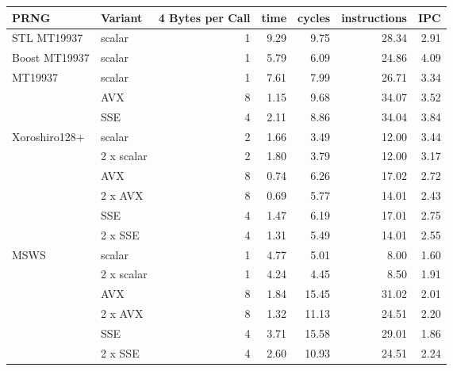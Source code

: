 \documentclass{stdlocal}
\begin{document}
\begin{tabular}{llrrrrr}
  \hline
  PRNG & Variant & 4 Bytes per Call & time & cycles & instructions & IPC \\
  \hline
  \hline
  STL MT19937 & scalar & 1 & 9.29 & 9.75 & 28.34 & 2.91 \\
  \hline
  Boost MT19937 & scalar & 1 & 5.79 & 6.09 & 24.86 & 4.09 \\
  \hline
  \multirow{3}{*}{MT19937}
  & scalar & 1 & 7.61 & 7.99 & 26.71 & 3.34 \\
  & AVX & 8 & 1.15 & 9.68 & 34.07 & 3.52 \\
  & SSE & 4 & 2.11 & 8.86 & 34.04 & 3.84 \\
  \hline
  \multirow{6}{*}{Xoroshiro128+}
  & scalar & 2 & 1.66 & 3.49 & 12.00 & 3.44 \\
  & 2 x scalar & 2 & 1.80 & 3.79 & 12.00 & 3.17 \\
  & AVX & 8 & 0.74 & 6.26 & 17.02 & 2.72 \\
  & 2 x AVX & 8 & 0.69 & 5.77 & 14.01 & 2.43 \\
  & SSE & 4 & 1.47 & 6.19 & 17.01 & 2.75 \\
  & 2 x SSE & 4 & 1.31 & 5.49 & 14.01 & 2.55 \\
  \hline
  \multirow{6}{*}{MSWS}
  & scalar & 1 & 4.77 & 5.01 & 8.00 & 1.60 \\
  & 2 x scalar & 1 & 4.24 & 4.45 & 8.50 & 1.91 \\
  & AVX & 8 & 1.84 & 15.45 & 31.02 & 2.01 \\
  & 2 x AVX & 8 & 1.32 & 11.13 & 24.51 & 2.20 \\
  & SSE & 4 & 3.71 & 15.58 & 29.01 & 1.86 \\
  & 2 x SSE & 4 & 2.60 & 10.93 & 24.51 & 2.24 \\
  \hline
\end{tabular}
\end{document}
